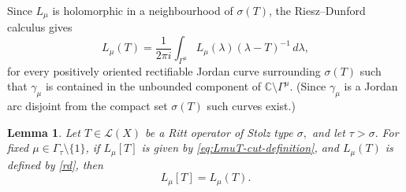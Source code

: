 \documentclass[11pt]{amsart}
\numberwithin{equation}{section}
\newtheorem{lemma}[theorem]{Lemma}
\theoremstyle{definition}
\theoremstyle{plain}
\begin{document}
Since $L_\mu$ is holomorphic in a neighbourhood of $\sigma(T)$,  the Riesz--Dunford calculus gives
\begin{equation}\label{rd}
        L_\mu(T)
        =
        \frac{1}{2\pi i}
        \int_{\Gamma^{\mu}}
             L_\mu(\lambda)(\lambda-T)^{-1}\,d\lambda,
\end{equation}
for every positively oriented rectifiable Jordan curve surrounding \( \sigma(T)\)
such that  $\gamma_\mu$ is
contained in the unbounded component of $\mathbb C\setminus\Gamma^{\mu}$.
(Since \(\gamma_\mu\) is a Jordan arc disjoint from the compact set \(\sigma(T)\) such curves exist.)
\begin{lemma}\label{lem:operator-cut-faithfulness}
Let $T\in \mathcal L(X)$ be a Ritt operator of Stolz type $\sigma,$ and let $\tau> \sigma.$
For fixed \(\mu\in\Gamma_\tau\setminus\{1\}\), if  \(L_\mu [T]\) is
given by \eqref{eq:LmuT-cut-definition}, and \(L_\mu(T)\) is defined by \eqref{rd}, then
\[
L_\mu[T]=L_\mu(T).
\]
\end{lemma}
\end{document}
